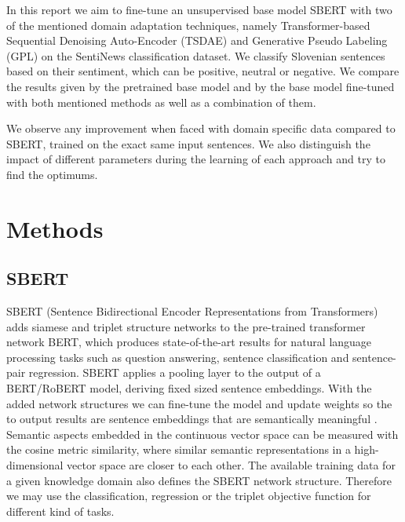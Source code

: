 \documentclass[fleqn,moreauthors,10pt]{ds_report}
\begin{document}
In this report we aim to fine-tune an unsupervised base model SBERT with two of the mentioned domain adaptation techniques, namely Transformer-based Sequential Denoising Auto-Encoder (TSDAE) and Generative Pseudo Labeling (GPL) on the SentiNews classification dataset. We classify Slovenian sentences based on their sentiment, which can be positive, neutral or negative. We compare the results given by the pretrained base model and by the base model fine-tuned with both mentioned methods as well as a combination of them. 

We observe any improvement when faced with domain specific data compared to SBERT, trained on the exact same input sentences. We also distinguish the impact of different parameters during the learning of each approach and try to find the optimums.






\section*{Methods}

\subsection*{SBERT}
SBERT (Sentence Bidirectional Encoder Representations from Transformers) adds siamese and triplet structure networks to the pre-trained transformer network BERT, which produces state-of-the-art results for natural language processing tasks such as question answering, sentence classification and sentence-pair regression. SBERT applies a pooling layer to the output of a BERT/RoBERT model, deriving fixed sized sentence embeddings. With the added network structures we can fine-tune the model and update weights so the to output results are sentence embeddings that are semantically meaningful \cite{SBERT}. Semantic aspects embedded in the continuous vector space can be measured with the cosine metric similarity, where similar semantic representations in a high-dimensional vector space are closer to each other. The available training data for a given knowledge domain also defines the SBERT network structure. Therefore we may use the classification, regression or the triplet objective function for different kind of tasks.
\end{document}
